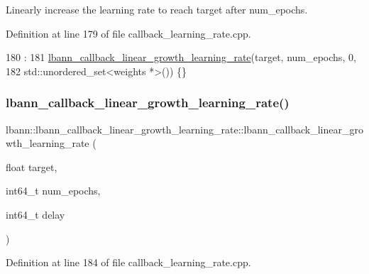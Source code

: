 Linearly increase the learning rate to reach target after num\+\_\+epochs. 

Definition at line 179 of file callback\+\_\+learning\+\_\+rate.\+cpp.


\begin{DoxyCode}
180                                     :
181   \hyperlink{classlbann_1_1lbann__callback__linear__growth__learning__rate_a9eb24d8032af168a0eeec7e385909d55}{lbann\_callback\_linear\_growth\_learning\_rate}(target, num\_epochs, 
      0,
182                                              std::unordered\_set<weights *>()) \{\}
\end{DoxyCode}
\mbox{\label{classlbann_1_1lbann__callback__linear__growth__learning__rate_a288be0ef560e9169a634c2238b50370e}} 
\subsubsection{\texorpdfstring{lbann\+\_\+callback\+\_\+linear\+\_\+growth\+\_\+learning\+\_\+rate()}{lbann\_callback\_linear\_growth\_learning\_rate()}\hspace{0.1cm}{\footnotesize\ttfamily [2/4]}}
{\footnotesize\ttfamily lbann\+::lbann\+\_\+callback\+\_\+linear\+\_\+growth\+\_\+learning\+\_\+rate\+::lbann\+\_\+callback\+\_\+linear\+\_\+growth\+\_\+learning\+\_\+rate (\begin{DoxyParamCaption}\item[{float}]{target,  }\item[{int64\+\_\+t}]{num\+\_\+epochs,  }\item[{int64\+\_\+t}]{delay }\end{DoxyParamCaption})}



Definition at line 184 of file callback\+\_\+learning\+\_\+rate.\+cpp.


